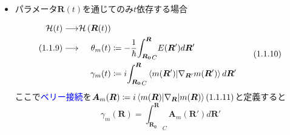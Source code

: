 \documentclass[a4paper,11pt,dvipdfmx]{jsarticle}
\DeclareMathOperator{\re}{Re}
\theoremstyle{definition}%
\numberwithin{equation}{section}%
\numberwithin{theorem}{section} %
\begin{document}
\begin{itemize}
  \(\sum_{n\neq m}\frac{\braket{m|\dot{\mathcal{H}}|n}}{E_n-E_m}\ll1\)と仮定して無視する(断熱近似)と
  \begin{equation}
    \frac{d}{dt}C_m(t)=\frac{1}{i\hbar}E_m(t)C_m(t)-\braket{m|\dot{m}}C_m(t).
  \end{equation}
  微分方程式を解くと
  \begin{equation}
    C_m(t)=C_m(0)\exp\left(i\theta_m(t)\right)\cdot\exp\left(i\gamma_m(t)\right)
  \end{equation}
  \begin{equation}
    \begin{dcases}
      \theta_m(t)\coloneq-\frac{1}{\hbar}\int_{0}^{t}E_m(t')dt' \ \text{\textcolor{blue}{動的位相 dynamical phase}} \\
      \gamma_m(t)\coloneq i\int_{0}^{t}\braket{m(t')|\dot{m}(t')}dt' \ \text{\textcolor{blue}{幾何学的位相 geometric phase}}
    \end{dcases}
  \end{equation}
  本当に位相?
  \begin{align}
    \theta_m&\cdots\text{明らかに実数} \\
    \gamma_m&\cdots\frac{d}{dt}\braket{m|m}=\braket{\dot{m}|m}+\braket{m|\dot{m}}=0\Longrightarrow 2\re\left[\braket{m|\dot{m}}\right]=0\Longrightarrow\braket{m|\dot{m}}\text{は純虚数}\Longrightarrow\gamma_m\text{は実数}
  \end{align}

  \item パラメータ\(\bm{R}(t)\)を通じてのみ\(t\)依存する場合
  
  \begin{equation}
    \begin{alignedat}{2}
      \mathcal{H}(t)&\longrightarrow & \mathcal{H}\left(\bm{R}(t)\right) & \\
      (1.1.9)&\longrightarrow & \theta_m(t)&\coloneq-\frac{1}{\hbar}{\int_{\bm{R_0}}^{\bm{R}}}_{C}E(\bm{R}')d\bm{R}' \\
      &&\gamma_m(t)&\coloneq i{\int_{\bm{R_0}}^{\bm{R}}}_C\braket{m(\bm{R}')|\nabla_{\bm{R}'}m(\bm{R}')}d\bm{R}'
    \end{alignedat}
    \tag{1.1.10}
  \end{equation}
  ここで\textcolor{blue}{ベリー接続}を\(\bm{A}_m(\bm{R})\coloneq i\braket{m(\bm{R})|\nabla_{\bm{R}}|m(\bm{R})}(1.1.11)\)と定義すると
  \begin{equation}
    \gamma_m(\bm{R})={\int_{\bm{R_0}}^{\bm{R}}}_C\bm{A}_m(\bm{R}')d\bm{R}'\tag{1.1.12}
  \end{equation}



\end{itemize}
\end{document}
